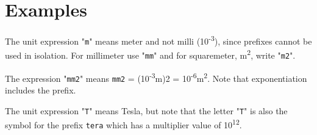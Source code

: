 \section{Examples}

The unit expression "\lstinline[basicstyle=\ttfamily]!m!" means meter and not milli
(10\textsuperscript{-3}), since prefixes cannot be used in isolation.
For millimeter use "\lstinline[basicstyle=\ttfamily]!mm!" and for squaremeter, m\textsuperscript{2}, write
"\lstinline[basicstyle=\ttfamily]!m2!".

The expression "\lstinline[basicstyle=\ttfamily]!mm2!" means \lstinline[basicstyle=\ttfamily]!mm2! = (10\textsuperscript{-3}m)2 =
10\textsuperscript{-6}m\textsuperscript{2}. Note that exponentiation
includes the prefix.

The unit expression "\lstinline[basicstyle=\ttfamily]!T!" means Tesla, but note that the letter "\lstinline[basicstyle=\ttfamily]!T!" is
also the symbol for the prefix \lstinline[basicstyle=\ttfamily]!tera! which has a multiplier value of
10\textsuperscript{12}.
